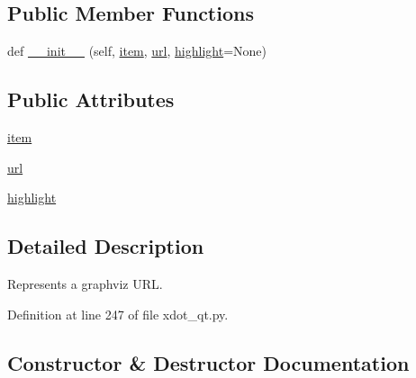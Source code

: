 \subsection*{Public Member Functions}
\begin{DoxyCompactItemize}
\item 
def \hyperlink{classsmacc__viewer_1_1xdot_1_1xdot__qt_1_1Url_ae0df8c6d142cfe2858ee4ae39ee96fa1}{\+\_\+\+\_\+init\+\_\+\+\_\+} (self, \hyperlink{classsmacc__viewer_1_1xdot_1_1xdot__qt_1_1Url_a53a5d1f937d3af9ea0ea13ca416961db}{item}, \hyperlink{classsmacc__viewer_1_1xdot_1_1xdot__qt_1_1Url_a0bdfbec6ad0015937a0965e53f8728ad}{url}, \hyperlink{classsmacc__viewer_1_1xdot_1_1xdot__qt_1_1Url_a40eb83526f5befaebbe896f87351e5af}{highlight}=None)
\end{DoxyCompactItemize}
\subsection*{Public Attributes}
\begin{DoxyCompactItemize}
\item 
\hyperlink{classsmacc__viewer_1_1xdot_1_1xdot__qt_1_1Url_a53a5d1f937d3af9ea0ea13ca416961db}{item}
\item 
\hyperlink{classsmacc__viewer_1_1xdot_1_1xdot__qt_1_1Url_a0bdfbec6ad0015937a0965e53f8728ad}{url}
\item 
\hyperlink{classsmacc__viewer_1_1xdot_1_1xdot__qt_1_1Url_a40eb83526f5befaebbe896f87351e5af}{highlight}
\end{DoxyCompactItemize}


\subsection{Detailed Description}
\begin{DoxyVerb}Represents a graphviz URL.\end{DoxyVerb}
 

Definition at line 247 of file xdot\+\_\+qt.\+py.



\subsection{Constructor \& Destructor Documentation}
